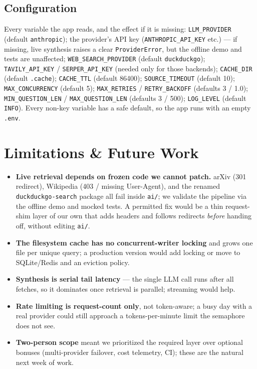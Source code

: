 \documentclass[11pt,a4paper]{article}
\begin{document}
\subsection{Configuration}

Every variable the app reads, and the effect if it is missing:
\texttt{LLM\_PROVIDER} (default \texttt{anthropic}); the provider's API key
(\texttt{ANTHROPIC\_API\_KEY} etc.) --- if missing, live synthesis raises a clear
\texttt{ProviderError}, but the offline demo and tests are unaffected;
\texttt{WEB\_SEARCH\_PROVIDER} (default \texttt{duckduckgo}); \texttt{TAVILY\_API\_KEY} /
\texttt{SERPER\_API\_KEY} (needed only for those backends); \texttt{CACHE\_DIR} (default
\texttt{.cache}); \texttt{CACHE\_TTL} (default 86400); \texttt{SOURCE\_TIMEOUT} (default 10);
\texttt{MAX\_CONCURRENCY} (default 5); \texttt{MAX\_RETRIES} / \texttt{RETRY\_BACKOFF}
(defaults 3 / 1.0); \texttt{MIN\_QUESTION\_LEN} / \texttt{MAX\_QUESTION\_LEN} (defaults 3 /
500); \texttt{LOG\_LEVEL} (default \texttt{INFO}). Every non-key variable has a safe default,
so the app runs with an empty \texttt{.env}.

\section{Limitations \& Future Work}\label{sec:limits}

\begin{itemize}[leftmargin=1.4em,itemsep=3pt]
  \item \textbf{Live retrieval depends on frozen code we cannot patch.} arXiv (301 redirect),
  Wikipedia (403 / missing User-Agent), and the renamed \texttt{duckduckgo-search} package all
  fail inside \texttt{ai/}; we validate the pipeline via the offline demo and mocked tests. A
  permitted fix would be a thin request-shim layer of our own that adds headers and follows
  redirects \emph{before} handing off, without editing \texttt{ai/}.
  \item \textbf{The filesystem cache has no concurrent-writer locking} and grows one file per
  unique query; a production version would add locking or move to SQLite/Redis and an eviction
  policy.
  \item \textbf{Synthesis is serial tail latency} --- the single LLM call runs after all
  fetches, so it dominates once retrieval is parallel; streaming would help.
  \item \textbf{Rate limiting is request-count only}, not token-aware; a busy day with a real
  provider could still approach a tokens-per-minute limit the semaphore does not see.
  \item \textbf{Two-person scope} meant we prioritized the required layer over optional bonuses
  (multi-provider failover, cost telemetry, CI); these are the natural next week of work.
\end{itemize}
\end{document}
